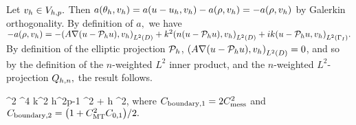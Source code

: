 Let $v_{h} \in V_{h,p}.$ Then $a(\theta_{h},v_{h}) = a(u-u_{h},v_{h}) - a(\rho,v_{h}) = -a(\rho,v_{h})$ by Galerkin orthogonality. By definition of $a,$ we have $-a(\rho,\vh) = -\IPLtD{A\grad\mleft(u-\Ph u\mright)}{\vh} + k^2 \IPLtD{n\mleft(u-\Ph u\mright)}{\vh} + ik\IPLtGI{u-\Ph u}{\vh}.$ By definition of the elliptic projection $\mathcal P_{h}$, $\IPLtD{A\grad\mleft(u-\Ph u\mright)}{\vh} = 0$, and so by the definition of the $n$-weighted $L^2$ inner product, and the $n$-weighted $L^2$-projection $Q_{h,n},$ the result follows.
\epf

\label{lem:boundarybound}
\beq\label{eq:boundarybound}
\NLtGI{\thetah}^2 \leq \Cboundaryo {}^4 k^2 h^{2p-1} ^2 + \Cboundaryt h \NW{\rho}^2,
\eeq
where $C_{\mathrm{boundary},1} = 2C_{\mathrm{mess}}^2$ and $\Cboundaryt = \mleft(1 + \CMT^2 \Cfn{0,1}\mright)/2.$
\ele

